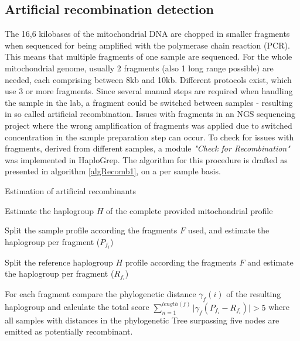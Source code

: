 \subsection{Artificial recombination detection}
The 16,6 kilobases of the mitochondrial DNA are chopped in smaller fragments when sequenced for being amplified with the polymerase chain reaction (PCR). This means that multiple fragments of one sample are sequenced. For the whole mitochondrial genome, usually 2 fragments (also 1 long range possible) are needed, each comprising between 8kb and 10kb. Different protocols exist, which use 3 or more fragments. Since several manual steps are required when handling the sample in the lab, a fragment could be switched between samples - resulting in so called artificial recombination. Issues with fragments in an NGS sequencing project where the wrong amplification of fragments was applied due to switched concentration in the sample preparation step can occur.
To check for issues with fragments, derived from different samples, a module \textit{"Check for Recombination"} was implemented in HaploGrep. The algorithm for this procedure is  drafted as presented in algorithm \ref{algRecomb1}, on a per sample basis.
\begin{algorithm}
  \caption{Estimation of artificial recombinants}
  \label{algRecomb1}

Estimate the haplogroup $H$ of the complete provided mitochondrial profile 

Split the sample profile according the fragments $F$ used, and estimate the haplogroup per fragment ($P_{f_i}$)

Split the reference haplogroup $H$ profile according the fragments $F$ and estimate the haplogroup per fragment ($R_{f_i}$)
	
For each fragment compare the phylogenetic distance $\gamma_f(i)$ of the resulting haplogroup and calculate the total score 
$\sum_{n=1}^{length(f)} |{\gamma_f(P_{f_i} - R_{f_i})| > 5}$ 
where all samples with distances in the phylogenetic Tree surpassing five nodes are emitted as potentially recombinant.
\end{algorithm}


